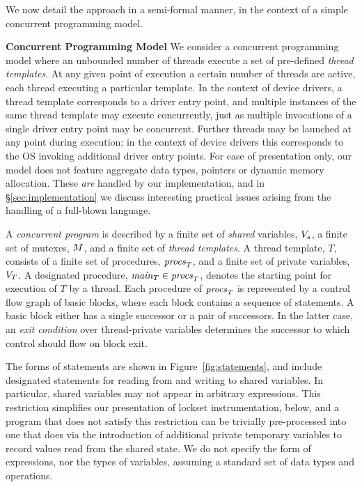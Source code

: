 We now detail the approach in a semi-formal manner, in the context of a simple concurrent programming model.

\medskip\noindent\textbf{Concurrent Programming Model }
%
We consider a concurrent programming model where an unbounded number of threads execute a set of pre-defined \emph{thread templates}.  At any given point of execution a certain number of threads are active, each thread executing a particular template.  In the context of device drivers, a thread template corresponds to a driver entry point, and multiple instances of the same thread template may execute concurrently, just as multiple invocations of a single driver entry point may be concurrent.  Further threads may be launched at any point during execution; in the context of device drivers this corresponds to the OS invoking additional driver entry points.  For ease of presentation only, our model does not feature aggregate data types, pointers or dynamic memory allocation.  These \emph{are} handled by our implementation, and in \S\ref{sec:implementation} we discuss interesting practical issues arising from the handling of a full-blown language.

A \emph{concurrent program} is described by a finite set of \emph{shared} variables, $V_s$, a finite set of mutexes, $M$, and a finite set of \emph{thread templates}.  A thread template, $T$, consists of a finite set of procedures, $\mathit{procs}_{T}$, and a finite set of private variables, $V_{T}$.  A designated procedure, $\mathit{main}_{T} \in \mathit{procs}_{T}$, denotes the starting point for execution of $T$ by a thread.  Each procedure of $\mathit{procs}_{T}$ is represented by a control flow graph of basic blocks, where each block contains a sequence of statements.  A basic block either has a single successor or a pair of successors.  In the latter case, an \emph{exit condition} over thread-private variables determines the successor to which control should flow on block exit.

The forms of statements are shown in Figure~\ref{fig:statements}, and include designated statements for reading from and writing to shared variables.  In particular, shared variables may not appear in arbitrary expressions.  This restriction simplifies our presentation of lockset instrumentation, below, and a program that does not satisfy this restriction can be trivially pre-processed into one that does via the introduction of additional private temporary variables to record values read from the shared state.  We do not specify the form of expressions, nor the types of variables, assuming a standard set of data types and operations.

